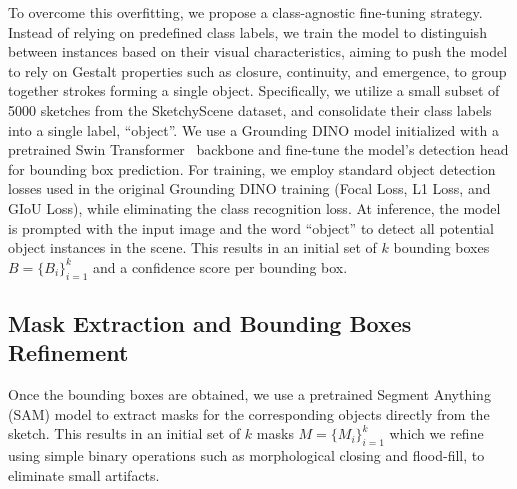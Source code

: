 To overcome this overfitting, we propose a class-agnostic fine-tuning strategy. Instead of relying on predefined class labels, we train the model to distinguish between instances based on their visual characteristics, aiming to push the model to rely on Gestalt properties such as closure, continuity, and emergence, to group together strokes forming a single object. Specifically, we utilize a small subset of 5000 sketches from the SketchyScene dataset, and consolidate their class labels into a single label, ``object''.  We use a Grounding DINO model initialized with a pretrained Swin Transformer~\cite{liu2021Swin} backbone and fine-tune the model's detection head for bounding box prediction. For training, we employ standard object detection losses used in the original Grounding DINO training (Focal Loss, L1 Loss, and GIoU Loss), while eliminating the class recognition loss. At inference, the model is prompted with the input image and the word ``object'' to detect all potential object instances in the scene. This results in an initial set of $k$ bounding boxes $B=\{B_i\}_{i=1}^k$ and a confidence score per bounding box. 

\subsection{Mask Extraction and Bounding Boxes Refinement}
Once the bounding boxes are obtained, we use a pretrained Segment Anything (SAM) model \cite{kirillov2023segany} to extract masks for the corresponding objects directly from the sketch. This results in an initial set of $k$ masks $M=\{M_i\}_{i=1}^k$ which we refine using simple binary operations such as morphological closing and flood-fill, to eliminate small artifacts.

